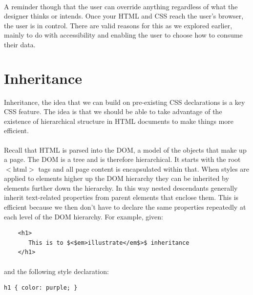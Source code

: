 \paragraph{} A reminder though that the user can override anything regardless of what the designer thinks or intends. Once your HTML and CSS reach the user’s browser, the user is in control. There are valid reasons for this as we explored earlier, mainly to do with accessibility and enabling the user to choose how to consume their data.



\section{Inheritance}
\paragraph{} Inheritance, the idea that we can build on pre-existing CSS declarations is a key CSS feature. The idea is that we should be able to take advantage of the existence of hierarchical structure in HTML documents to make things more efficient.
\paragraph{} Recall that HTML is parsed into the DOM, a model of the objects that make up a page. The DOM is a tree and is therefore hierarchical. It starts with the root $<$html$>$ tags and all page content is encapsulated within that. When styles are applied to elements higher up the DOM hierarchy they can be inherited by elements further down the hierarchy. In this way nested descendants generally inherit text-related properties from parent elements that enclose them. This is efficient because we then don’t have to declare the same properties repeatedly at each level of the DOM hierarchy. For example, given:

\begin{lstlisting}
	<h1>
	   This is to $<$em>illustrate</em$>$ inheritance
	</h1>
\end{lstlisting}

\paragraph{} and the following style declaration:

\begin{lstlisting}
h1 { color: purple; }
\end{lstlisting}

